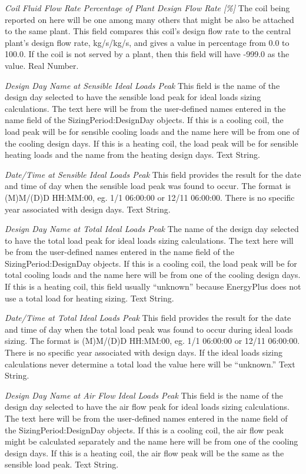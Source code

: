 \emph{Coil Fluid Flow Rate Percentage of Plant Design Flow Rate [\%]}  The coil being reported on here will be one among many others that might be also be attached to the same plant.  This field compares this coil's design flow rate to the central plant's design flow rate, {kg/s}/{kg/s}, and gives a value in percentage from 0.0 to 100.0.  If the coil is not served by a plant, then this field will have -999.0 as the value. Real Number.

\emph{Design Day Name at Sensible Ideal Loads Peak}  This field is the name of the design day selected to have the sensible load peak for ideal loads sizing calculations.  The text here will be from the user-defined names entered in the name field of the SizingPeriod:DesignDay objects.  If this is a cooling coil, the load peak will be for sensible cooling loads and the name here will be from one of the cooling design days.  If this is a heating coil, the load peak will be for sensible heating loads and the name from the heating design days.  Text String.

\emph{Date/Time at Sensible Ideal Loads Peak}  This field provides the result for the date and time of day when the sensible load peak was found to occur.  The format is (M)M/(D)D HH:MM:00, eg. 1/1 06:00:00 or 12/11 06:00:00.  There is no specific year associated with design days. Text String.

\emph{Design Day Name at Total Ideal Loads Peak}  The name of the design day selected to have the total load peak for ideal loads sizing calculations.  The text here will be from the user-defined names entered in the name field of the SizingPeriod:DesignDay objects.  If this is a cooling coil, the load peak will be for total cooling loads and the name here will be from one of the cooling design days.  If this is a heating coil, this field usually ``unknown'' because EnergyPlus does not use a total load for heating sizing. Text String.

\emph{Date/Time at Total Ideal Loads Peak}  This field provides the result for the date and time of day when the total load peak was found to occur during ideal loads sizing.  The format is (M)M/(D)D HH:MM:00, eg. 1/1 06:00:00 or 12/11 06:00:00.  There is no specific year associated with design days.  If the ideal loads sizing calculations never determine a total load the value here will be ``unknown.''  Text String.

\emph{Design Day Name at Air Flow Ideal Loads Peak}  This field is the name of the design day selected to have the air flow peak for ideal loads sizing calculations.  The text here will be from the user-defined names entered in the name field of the SizingPeriod:DesignDay objects.  If this is a cooling coil, the air flow peak might be calculated separately and the name here will be from one of the cooling design days.  If this is a heating coil, the air flow peak will be the same as the sensible load peak.  Text String.

